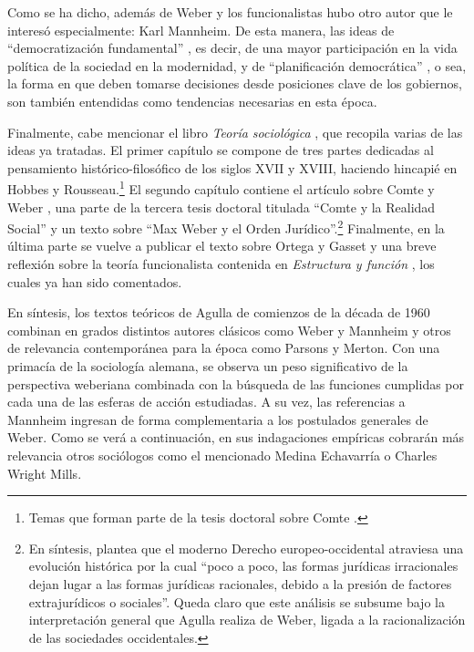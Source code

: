 Como se ha dicho, además de Weber y los funcionalistas hubo otro autor que le interesó especialmente: Karl Mannheim. De esta manera, las ideas de \enquote{democratización fundamental} \parencites[766]{1646-AGULLA1963}[págs.~18 y~88]{1641-AGULLA1965}[37]{1645-AGULLA1966}, es decir, de una mayor participación en la vida política de la sociedad en la modernidad, y de \enquote{planificación democrática} \parencite[19]{1641-AGULLA1965}, o sea, la forma en que deben tomarse decisiones desde posiciones clave de los gobiernos, son también entendidas como tendencias necesarias en esta época.

Finalmente, cabe mencionar el libro \emph{Teoría sociológica} \parencite{1647-AGULLA1964}, que recopila varias de las ideas ya tratadas. El primer capítulo se compone de tres partes dedicadas al pensamiento histórico-filosófico de los siglos XVII y XVIII, haciendo hincapié en Hobbes y Rousseau.\footnote{Temas que forman parte de la tesis doctoral sobre Comte \parencite{1637-AGULLA1962}.} El segundo capítulo contiene el artículo sobre Comte y Weber \parencite{1636-AGULLA1959}, una parte de la tercera tesis doctoral titulada \enquote{Comte y la Realidad Social} y un texto sobre \enquote{Max Weber y el Orden Jurídico}.\footnote{En síntesis, \textcite[87]{1647-AGULLA1964} plantea que el moderno Derecho europeo-occidental atraviesa una evolución histórica por la cual \enquote{poco a poco, las formas jurídicas irracionales dejan lugar a las formas jurídicas racionales, debido a la presión de factores extrajurídicos o sociales}. Queda claro que este análisis se subsume bajo la interpretación general que Agulla realiza de Weber, ligada a la racionalización de las sociedades occidentales.} Finalmente, en la última parte se vuelve a publicar el texto sobre Ortega y Gasset \parencite{1639-AGULLA1962} y una breve reflexión sobre la teoría funcionalista contenida en \emph{Estructura y función} \parencite{1637-AGULLA1962}, los cuales ya han sido comentados.

En síntesis, los textos teóricos de Agulla de comienzos de la década de 1960 combinan en grados distintos autores clásicos como Weber y Mannheim y otros de relevancia contemporánea para la época como Parsons y Merton. Con una primacía de la sociología alemana, se observa un peso significativo de la perspectiva weberiana combinada con la búsqueda de las funciones cumplidas por cada una de las esferas de acción estudiadas. A su vez, las referencias a Mannheim ingresan de forma complementaria a los postulados generales de Weber. Como se verá a continuación, en sus indagaciones empíricas cobrarán más relevancia otros sociólogos como el mencionado Medina Echavarría o Charles Wright Mills.


